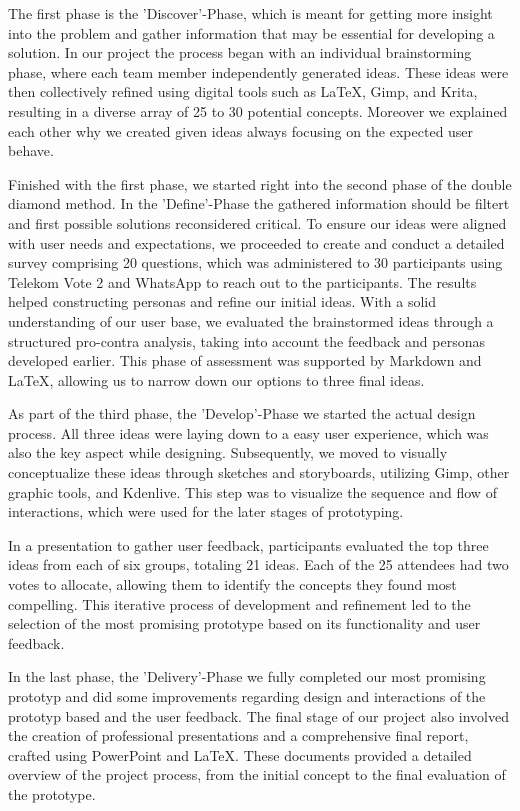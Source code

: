 \documentclass{article}
\begin{document}
The first phase is the 'Discover'-Phase, which is meant for getting more insight into the problem and gather information that may be essential for developing a solution.
In our project the process began with an individual brainstorming phase,
where each team member independently generated ideas.
These ideas were then collectively refined using digital tools such as LaTeX, Gimp, and Krita,
resulting in a diverse array of 25 to 30 potential concepts.
Moreover we explained each other why we created given ideas always focusing on the expected user behave.

Finished with the first phase, we started right into the second phase of the double diamond method. In the 'Define'-Phase the gathered information should be filtert and first possible solutions reconsidered critical.
To ensure our ideas were aligned with user needs and expectations,
we proceeded to create and conduct a detailed survey comprising 20 questions,
which was administered to 30 participants using Telekom Vote 2 and WhatsApp to reach out to the participants.
The results helped constructing personas and refine our initial ideas. With a solid understanding of our user base,
we evaluated the brainstormed ideas through a structured pro-contra analysis,
taking into account the feedback and personas developed earlier.
This phase of assessment was supported by Markdown and LaTeX,
allowing us to narrow down our options to three final ideas.


As part of the third phase, the 'Develop'-Phase we started the actual design process. All three ideas were laying down to a easy user experience, which was also the key aspect while designing.
Subsequently, we moved to visually conceptualize these ideas through sketches and storyboards,
utilizing Gimp, other graphic tools, and Kdenlive.
This step was to visualize the sequence and flow of interactions,
which were used for the later stages of prototyping.

In a presentation to gather user feedback,
participants evaluated the top three ideas from each of six groups, totaling 21 ideas.
Each of the 25 attendees had two votes to allocate,
allowing them to identify the concepts they found most compelling.
This iterative process of development and refinement led to the selection
of the most promising prototype based on its functionality and user feedback.

In the last phase, the 'Delivery'-Phase we fully completed our most promising prototyp and did some improvements regarding design and interactions of the prototyp based and the user feedback.
The final stage of our project also involved the creation of professional presentations and a comprehensive final report,
crafted using PowerPoint and LaTeX. These documents provided a detailed overview of the project process,
from the initial concept to the final evaluation of the prototype.
\end{document}
